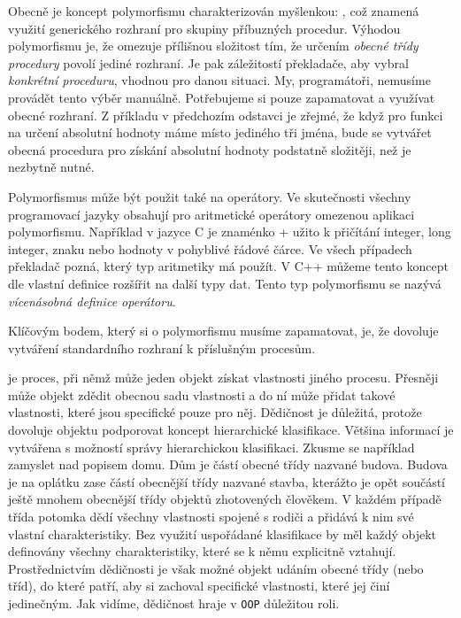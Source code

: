 \begin{description}[noitemsep]
          Obecně je koncept polymorfismu charakterizován myšlenkou: , což znamená využití generického rozhraní pro skupiny příbuzných procedur. Výhodou
          polymorfismu je, že omezuje přílišnou složitost tím, že určením \emph{obecné třídy
          procedury} povolí jediné rozhraní. Je pak záležitostí překladače, aby vybral
          \emph{konkrétní proceduru}, vhodnou pro danou situaci. My, programátoři, nemusíme provádět
          tento výběr manuálně. Potřebujeme si pouze zapamatovat a využívat obecné rozhraní. Z
          příkladu v předchozím odstavci je zřejmé, že když pro funkci na určení absolutní hodnoty
          máme místo jediného tři jména, bude se vytvářet obecná procedura pro získání absolutní
          hodnoty podstatně složitěji, než je nezbytně nutné.

          Polymorfismus může být použit také na operátory. Ve skutečnosti všechny programovací
          jazyky obsahují pro aritmetické operátory omezenou aplikaci polymorfismu. Například v
          jazyce C je znaménko + užito k přičítání integer, long integer, znaku nebo hodnoty v
          pohyblivé řádové čárce. Ve všech případech překladač pozná, který typ aritmetiky má
          použít. V C++ můžeme tento koncept dle vlastní definice rozšířit na další typy dat. Tento
          typ polymorfismu se nazývá \emph{vícenásobná definice operátoru}.

          Klíčovým bodem, který si o polymorfismu musíme zapamatovat, je, že dovoluje vytváření
          standardního rozhraní k příslušným procesům.

        \item[\textbf{Dědičnost}:] je proces, při němž může jeden objekt získat vlastnosti jiného
          procesu. Přesněji může objekt zdědit obecnou sadu vlastnosti a do ní může přidat takové
          vlastnosti, které jsou specifické pouze pro něj. Dědičnost je důležitá, protože dovoluje
          objektu podporovat koncept hierarchické klasifikace. Většina informací je vytvářena s
          možností správy hierarchickou klasifikaci. Zkusme se například zamyslet nad popisem domu.
          Dům je částí obecné třídy nazvané budova. Budova je na oplátku zase částí obecnější třídy
          nazvané stavba, kterážto je opět součástí ještě mnohem obecnější třídy objektů zhotovených
          člověkem. V každém případě třída potomka dědí všechny vlastnosti spojené s rodiči a
          přidává k nim své vlastní charakteristiky. Bez využití uspořádané klasifikace by měl každý
          objekt definovány všechny charakteristiky, které se k němu explicitně vztahují.
          Prostřednictvím dědičnosti je však možné objekt udáním obecné třídy (nebo tříd), do které
          patří, aby si zachoval specifické vlastnosti, které jej činí jedinečným. Jak vidíme,
          dědičnost hraje v \texttt{OOP} důležitou roli. 
      \end{description}   
